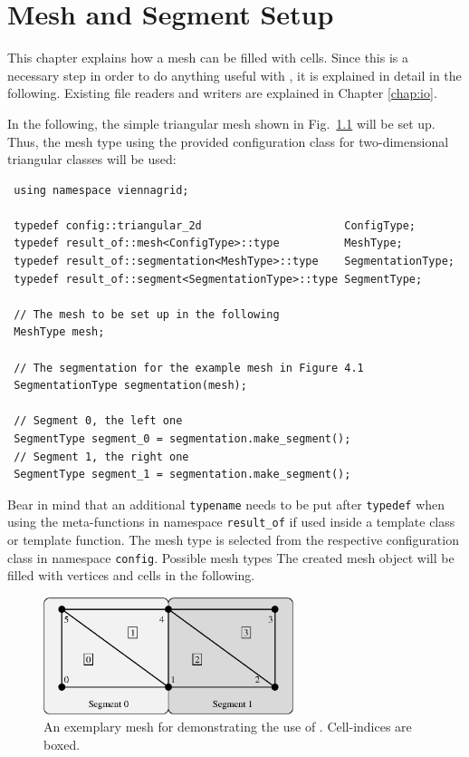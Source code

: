\chapter{Mesh and Segment Setup} \label{chap:meshsetup}

This chapter explains how a {\ViennaGrid} mesh can be filled with cells. Since this
is a necessary step in order to do anything useful with {\ViennaGrid}, it is explained in detail in the following.
Existing file readers and writers are explained in Chapter \ref{chap:io}.


In the following, the simple triangular mesh shown in Fig.~\ref{fig:samplemesh} will be set up.
Thus, the mesh type using the provided configuration class for two-dimensional triangular classes will be used:
\begin{lstlisting}
 using namespace viennagrid;

 typedef config::triangular_2d                      ConfigType;
 typedef result_of::mesh<ConfigType>::type          MeshType;
 typedef result_of::segmentation<MeshType>::type    SegmentationType;
 typedef result_of::segment<SegmentationType>::type SegmentType;

 // The mesh to be set up in the following
 MeshType mesh;

 // The segmentation for the example mesh in Figure 4.1
 SegmentationType segmentation(mesh);

 // Segment 0, the left one
 SegmentType segment_0 = segmentation.make_segment();
 // Segment 1, the right one
 SegmentType segment_1 = segmentation.make_segment();
\end{lstlisting}
Bear in mind that an additional \lstinline|typename| needs to be put after \lstinline|typedef| when using the meta-functions in namespace \texttt{result\_of} if used inside a template class or template function.
The mesh type is selected from the respective configuration class in namespace \texttt{config}.
Possible mesh types 
The created mesh object will be filled with vertices and cells in the following.

\begin{figure}[tb]
\centering
 \includegraphics[width=0.65\textwidth]{figures/samplemesh.eps}
 \caption{An exemplary mesh for demonstrating the use of {\ViennaGrid}. Cell-indices are boxed.}
 \label{fig:samplemesh}
\end{figure}

